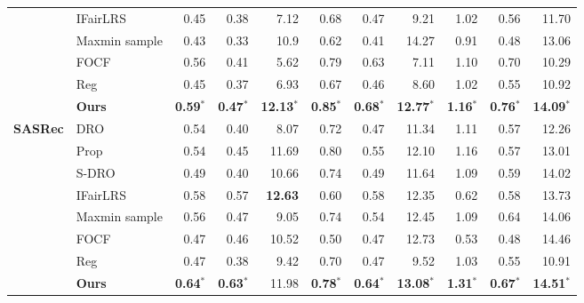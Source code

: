 \begin{table*}[t]
{\begin{tabular}{@{}clrrrrrrrrr@{}}
 & IFairLRS & 0.45 &  0.38  &  7.12   &  0.68 &  0.47  &  9.21  &  1.02 &  0.56  &  11.70 \\ 
 & Maxmin sample & 0.43 &  0.33 &  10.9 &  0.62 &  0.41 &  14.27 &  0.91 &  0.48 &  13.06 \\
 & FOCF & 0.56 &  0.41 &  5.62 &  0.79 &  0.63 &  7.11 &  1.10 &  0.70 &  10.29 \\
 & Reg & 0.45 &  0.37 &  6.93 &  0.67 &  0.46 &  8.60 &  1.02 &  0.55 &  10.92\\
 \cmidrule(l){2-5} \cmidrule(l){6-8} \cmidrule(l){9-11}
 & \textbf{Ours} & \textbf{0.59}$^*$ & \textbf{0.47}$^*$ & \textbf{12.13}$^*$ & \textbf{0.85}$^*$ & \textbf{0.68}$^*$ & \textbf{12.77}$^*$ & \textbf{1.16}$^*$ & \textbf{0.76}$^*$ & \textbf{14.09}$^*$  \\
 \bottomrule
 \multirow{9}{*}{\textbf{SASRec}}  & DRO & 0.54 &  0.40 &  8.07 &  0.72 &  0.47 &  11.34 &  1.11 &  0.57 &  12.26 \\ 
 & Prop & 0.54 &  0.45 &  11.69  &  0.80 &  0.55 &  12.10 &  1.16 &  0.57 &  13.01 \\ 
 & S-DRO & 0.49 &  0.40 &  10.66  &  0.74 &  0.49 &  11.64 &  1.09 &  0.59 &  14.02 \\ 
 & IFairLRS & 0.58 &  0.57 &  \textbf{12.63}  &  0.60 &  0.58 &  12.35 &  0.62 &  0.58 &  13.73 \\ 
 & Maxmin sample & 0.56 &  0.47 &  9.05 &  0.74 &  0.54 &  12.45 &  1.09 &  0.64 &  14.06 \\
 & FOCF & 0.47 &  0.46 &  10.52  &  0.50 &  0.47 &  12.73 &  0.53 &  0.48 &  14.46 \\
 & Reg & 0.47 &  0.38 &  9.42 &  0.70 &  0.47 &  9.52 &  1.03 &  0.55 &  10.91\\
 \cmidrule(l){2-5} \cmidrule(l){6-8} \cmidrule(l){9-11}
 & \textbf{Ours} & \textbf{0.64}$^*$ & \textbf{0.63}$^*$ & 11.98 & \textbf{0.78}$^*$ & \textbf{0.64}$^*$ & \textbf{13.08}$^*$ & \textbf{1.31}$^*$ & \textbf{0.67}$^*$ & \textbf{14.51}$^*$  \\
 \bottomrule
\end{tabular}
}
\end{table*}



